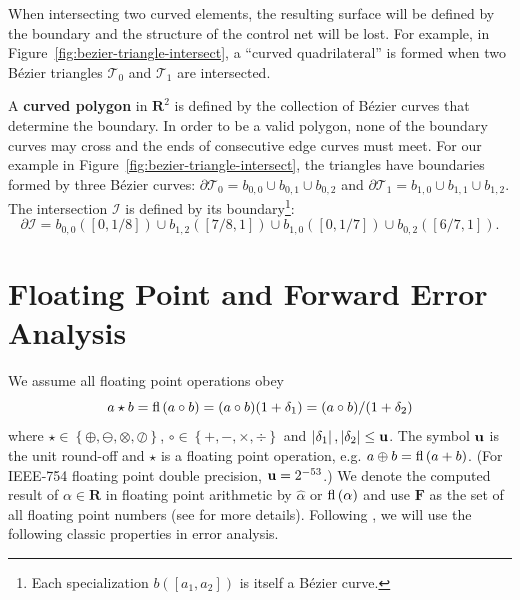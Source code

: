 When intersecting two curved elements, the resulting surface will
be defined by the boundary and the structure of the control net will
be lost. For example, in Figure~\ref{fig:bezier-triangle-intersect}, a
``curved quadrilateral'' is formed when two B\'{e}zier triangles
\(\mathcal{T}_0\) and \(\mathcal{T}_1\) are intersected.

A \textbf{curved polygon} in \(\mathbf{R}^2\) is defined by the collection
of B\'{e}zier curves that determine the boundary. In order to be
a valid polygon, none of the boundary curves may cross and the
ends of consecutive edge curves must meet. For our example in
Figure~\ref{fig:bezier-triangle-intersect}, the triangles
have boundaries formed by three B\'{e}zier curves:
\(\partial \mathcal{T}_0 = b_{0, 0} \cup b_{0, 1} \cup b_{0, 2}\) and
\(\partial \mathcal{T}_1 = b_{1, 0} \cup b_{1, 1} \cup b_{1, 2}\).
The intersection \(\mathcal{I}\) is defined by its boundary\footnote{Each
specialization \(b\left(\left[a_1, a_2\right]\right)\) is itself
a B\'{e}zier curve.}:
\begin{equation}
\partial \mathcal{I} = b_{0, 0}\left(\left[0, 1/8\right]\right) \cup
  b_{1, 2}\left(\left[7/8, 1\right]\right) \cup
  b_{1, 0}\left(\left[0, 1/7\right]\right) \cup
  b_{0, 2}\left(\left[6/7, 1\right]\right).
\end{equation}

\section{Floating Point and Forward Error Analysis}

We assume all floating point operations obey
\begin{equation}
  a \star b = \operatorname{fl}\left(a \circ b\right) = (a \circ b)(1 + \delta_1) =
  (a \circ b) / (1 + \delta_2)
\end{equation}
where \(\star \in \left\{\oplus, \ominus, \otimes, \oslash\right\}\), \(\circ
\in \left\{+, -, \times, \div\right\}\) and \(\left|\delta_1\right|,
\left|\delta_2\right| \leq \mathbf{u}\). The symbol \(\mathbf{u}\) is the unit round-off
and \(\star\) is a floating point operation, e.g.
\(a \oplus b = \operatorname{fl}\left(a + b\right)\). (For IEEE-754 floating point double precision,
\(\mathbf{u} = 2^{-53}\).) We denote the computed result of
\(\alpha \in \mathbf{R}\) in floating point arithmetic by
\(\widehat{\alpha}\) or \(\operatorname{fl}\left(\alpha\right)\) and use \(\mathbf{F}\) as the set of
all floating point numbers (see \cite{Higham2002} for more details).
Following \cite{Higham2002}, we will use the following classic properties in
error analysis.

